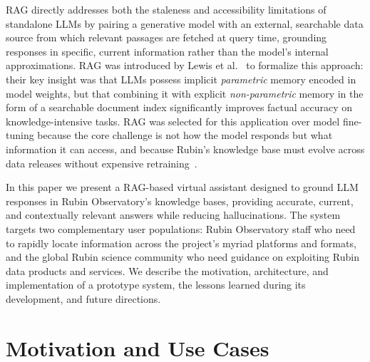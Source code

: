 \gls{RAG} directly addresses both the staleness and accessibility limitations of standalone LLMs by pairing a generative model with an external, searchable data source from which relevant passages are fetched at query time, grounding responses in specific, current information rather than the model's internal approximations.
\gls{RAG} was introduced by Lewis et al.~\cite{NEURIPS2020_6b493230} to formalize this approach: their key insight was that LLMs possess implicit \emph{parametric} memory encoded in model weights, but that combining it with explicit \emph{non-parametric} memory in the form of a searchable document index significantly improves factual accuracy on knowledge-intensive tasks.
RAG was selected for this application over model fine-tuning because the core challenge is not how the model responds but what information it can access, and 
because Rubin's knowledge base must evolve across data releases without expensive retraining~\cite{RAGvsFT}.

In this paper we present a \gls{RAG}-based virtual assistant designed to ground LLM responses in Rubin Observatory's knowledge bases, providing accurate, current, and contextually relevant answers while reducing hallucinations.
The system targets two complementary user populations: Rubin Observatory staff who need to rapidly locate information across the project's myriad platforms and formats, and the global Rubin science community who need guidance on exploiting Rubin data products and services.
We describe the motivation, architecture, and implementation of a prototype system, the lessons learned during its development, and future directions.

\section{Motivation and Use Cases}
\label{sec:motivation}

